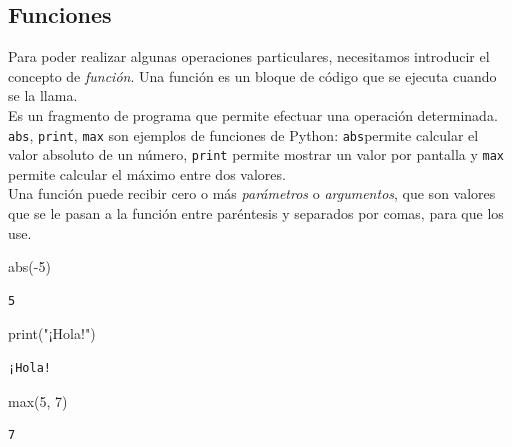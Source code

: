\documentclass[
  letterpaper,
  DIV=11,
  numbers=noendperiod]{scrreprt}
\newenvironment{Shaded}{\begin{snugshade}}{\end{snugshade}}
\newcommand{\BuiltInTok}[1]{\textcolor[rgb]{0.00,0.23,0.31}{#1}}
\newcommand{\DecValTok}[1]{\textcolor[rgb]{0.68,0.00,0.00}{#1}}
\newcommand{\NormalTok}[1]{\textcolor[rgb]{0.00,0.23,0.31}{#1}}
\newcommand{\OperatorTok}[1]{\textcolor[rgb]{0.37,0.37,0.37}{#1}}
\newcommand{\StringTok}[1]{\textcolor[rgb]{0.13,0.47,0.30}{#1}}
\begin{document}
\subsection{Funciones}\label{funciones}

Para poder realizar algunas operaciones particulares, necesitamos
introducir el concepto de \emph{función}. Una función es un bloque de
código que se ejecuta cuando se la llama.\\
Es un fragmento de programa que permite efectuar una operación
determinada. \texttt{abs}, \texttt{print}, \texttt{max} son ejemplos de
funciones de Python: \texttt{abs}permite calcular el valor absoluto de
un número, \texttt{print} permite mostrar un valor por pantalla y
\texttt{max} permite calcular el máximo entre dos valores.\\

Una función puede recibir cero o más \emph{parámetros} o
\emph{argumentos}, que son valores que se le pasan a la función entre
paréntesis y separados por comas, para que los use.\\

\begin{Shaded}
\begin{Highlighting}[]
\BuiltInTok{abs}\NormalTok{(}\OperatorTok{{-}}\DecValTok{5}\NormalTok{)}
\end{Highlighting}
\end{Shaded}

\begin{verbatim}
5
\end{verbatim}

\begin{Shaded}
\begin{Highlighting}[]
\BuiltInTok{print}\NormalTok{(}\StringTok{"¡Hola!"}\NormalTok{)}
\end{Highlighting}
\end{Shaded}

\begin{verbatim}
¡Hola!
\end{verbatim}

\begin{Shaded}
\begin{Highlighting}[]
\BuiltInTok{max}\NormalTok{(}\DecValTok{5}\NormalTok{, }\DecValTok{7}\NormalTok{)}
\end{Highlighting}
\end{Shaded}

\begin{verbatim}
7
\end{verbatim}
\end{document}
